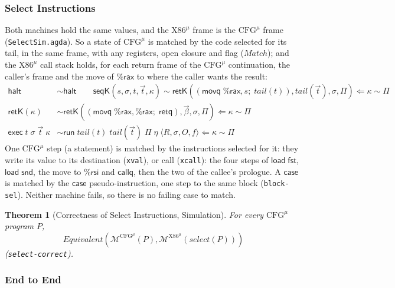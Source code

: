 \documentclass[10pt]{article}
\theoremstyle{acmplain}
\newtheorem{theorem}{Theorem}[section]
\newcommand{\key}[1]{\mathsf{#1}}
\newcommand{\pass}[1]{\mathit{#1}}
\newcommand{\Mach}[1]{\mathcal{M}^{#1}}
\newcommand{\Equiv}{\mathit{Equivalent}}
\newcommand{\Kf}[2]{\key{#1}(#2)}
\newcommand{\halt}{\key{halt}}
\newcommand{\exc}[4]{\key{exec}\;#1\;#2\;#3\;#4}
\newcommand{\rax}{\%\key{rax}}
\newcommand{\rsi}{\%\key{rsi}}
\newcommand{\xrun}{\key{run}}
\newcommand{\Ml}[1]{\textrm{#1}^{\mu}}                  %
\begin{document}
\subsubsection{Select Instructions}

Both machines hold the same values, and the $\Ml{X86}$ frame is the
$\Ml{CFG}$ frame (\texttt{SelectSim.agda}). So a state of $\Ml{CFG}$ is
matched by the code selected for its tail, in the same frame, with any
registers, open closure and flag ($\mathit{Match}$); and the $\Ml{X86}$ call
stack holds, for each return frame of the $\Ml{CFG}$ continuation, the
caller's frame and the move of $\rax$ to where the caller wants the
result:
\begin{align*}
  \halt &\sim \halt \qquad
  \Kf{seqK}{s, \sigma, t, \vec{t}, \kappa} \sim
    \key{retK}((\key{movq}\; \rax, s;\; \pass{tail}(t)), \pass{tail}(\vec{t}), \sigma, \Pi)
    \Leftarrow \kappa \sim \Pi \\
  \Kf{retK}{\kappa} &\sim \key{retK}((\key{movq}\; \rax, \rax;\; \key{retq}), \vec{\beta}, \sigma, \Pi)
    \Leftarrow \kappa \sim \Pi \\
  \exc{t}{\sigma}{\vec{t}}{\kappa} &\sim
    \xrun\;\pass{tail}(t)\;\pass{tail}(\vec{t})\;\Pi\;\eta\;\langle R, \sigma, O, f \rangle
    \Leftarrow \kappa \sim \Pi
\end{align*}
One $\Ml{CFG}$ step (a statement) is matched by the instructions selected
for it: they write its value to its destination (\texttt{xval}), or call
(\texttt{xcall}): the four steps of $\key{load}\;\key{fst}$,
$\key{load}\;\key{snd}$, the move to $\rsi$ and $\key{callq}$, then the two
of the callee's prologue. A $\key{case}$ is matched by the $\key{case}$
pseudo-instruction, one step to the same block (\texttt{block-sel}).
Neither machine fails, so there is no failing case to match.
\begin{theorem}[Correctness of Select Instructions, Simulation]\label{thm:m-cek-select}
For every $\Ml{CFG}$ program $P$,
\[ \Equiv(\Mach{\Ml{CFG}}(P), \Mach{\Ml{X86}}(\pass{select}(P))) \]
(\texttt{select-correct}).
\end{theorem}

\subsubsection{End to End}
\end{document}
